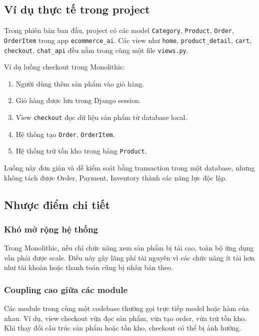 \documentclass[12pt,a4paper]{report}
\begin{document}
\subsection{Ví dụ thực tế trong project}

Trong phiên bản ban đầu, project có các model \texttt{Category}, \texttt{Product}, \texttt{Order}, \texttt{OrderItem} trong app \texttt{ecommerce\_ai}. Các view như \texttt{home}, \texttt{product\_detail}, \texttt{cart}, \texttt{checkout}, \texttt{chat\_api} đều nằm trong cùng một file \texttt{views.py}.

Ví dụ luồng checkout trong Monolithic:

\begin{enumerate}
  \item Người dùng thêm sản phẩm vào giỏ hàng.
  \item Giỏ hàng được lưu trong Django session.
  \item View \texttt{checkout} đọc dữ liệu sản phẩm từ database local.
  \item Hệ thống tạo \texttt{Order}, \texttt{OrderItem}.
  \item Hệ thống trừ tồn kho trong bảng \texttt{Product}.
\end{enumerate}

Luồng này đơn giản và dễ kiểm soát bằng transaction trong một database, nhưng không tách được Order, Payment, Inventory thành các năng lực độc lập.

\subsection{Nhược điểm chi tiết}

\subsubsection{Khó mở rộng hệ thống}

Trong Monolithic, nếu chỉ chức năng xem sản phẩm bị tải cao, toàn bộ ứng dụng vẫn phải được scale. Điều này gây lãng phí tài nguyên vì các chức năng ít tải hơn như tài khoản hoặc thanh toán cũng bị nhân bản theo.

\subsubsection{Coupling cao giữa các module}

Các module trong cùng một codebase thường gọi trực tiếp model hoặc hàm của nhau. Ví dụ, view checkout vừa đọc sản phẩm, vừa tạo order, vừa trừ tồn kho. Khi thay đổi cấu trúc sản phẩm hoặc tồn kho, checkout có thể bị ảnh hưởng.
\end{document}
